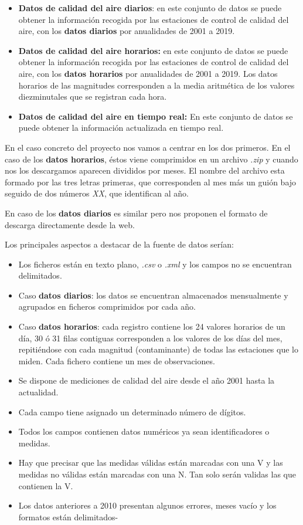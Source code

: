 \begin{itemize}
	\item \textbf{Datos de calidad del aire diarios}: en este conjunto de datos se puede obtener la información recogida por las estaciones de control de calidad del aire, con los \textbf{datos diarios} por anualidades de 2001 a 2019. 
	\item \textbf{Datos de calidad del aire horarios:} en este conjunto de datos se puede obtener la información recogida por las estaciones de control de calidad del aire, con los \textbf{datos horarios} por anualidades de 2001 a 2019. Los datos horarios de las magnitudes corresponden a la media aritmética de los valores diezminutales que se registran cada hora.
	\item \textbf{Datos de calidad del aire en tiempo real:} En este conjunto de datos se puede obtener la información actualizada en tiempo real.
\end{itemize}

En el caso concreto del proyecto nos vamos a centrar en los dos primeros. En el caso de los \textbf{datos horarios}, éstos viene comprimidos en un archivo \textit{.zip} y cuando nos los descargamos aparecen divididos por meses. El nombre del archivo esta formado por las tres letras primeras, que corresponden al mes más un guión bajo seguido de dos números \textit{XX}, que identifican al año.

En caso de los \textbf{datos diarios} es similar pero nos proponen el formato de descarga directamente desde la web.

Los principales aspectos a destacar de la fuente de datos serían: 
\begin{itemize}
	\item Los ficheros están en texto plano, \textit{.csv} o \textit{.xml} y los campos no se encuentran delimitados.
	\item Caso\textbf{ datos diarios}: los datos se encuentran almacenados mensualmente y agrupados en ficheros comprimidos por cada año.
	\item Caso\textbf{ datos horarios}: cada registro contiene los 24 valores horarios de un día, 30 ó 31 filas contiguas corresponden a los valores de los días del mes, repitiéndose con cada magnitud (contaminante) de todas las estaciones que lo miden. Cada fichero contiene un mes de observaciones.
	\item Se dispone de mediciones de calidad del aire desde el año 2001 hasta la actualidad. 
	\item Cada campo tiene asignado un determinado número de dígitos. 
	\item Todos los campos contienen datos numéricos ya sean identificadores o medidas.
	\item Hay que precisar que las medidas válidas están marcadas con una V y las medidas no válidas están marcadas con una N. Tan solo serán validas las que contienen la V.
	\item Los datos anteriores a 2010 presentan algunos errores, meses vacío y los formatos están delimitados-
\end{itemize}

